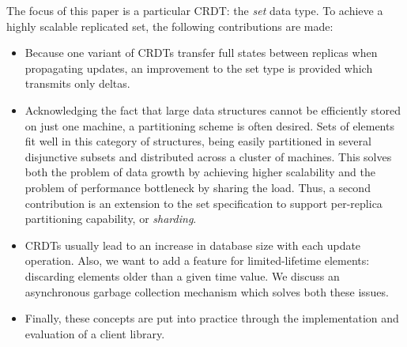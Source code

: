 The focus of this paper is a particular CRDT: the \textit{set} data type. To
achieve a highly scalable replicated set, the following contributions are made:
\begin{itemize}
  \item Because one variant of CRDTs transfer full states between replicas when
  propagating updates, an improvement to the set type is provided which
  transmits only deltas.
  \item Acknowledging the fact that large data structures cannot be efficiently
  stored on just one machine, a partitioning scheme is often desired. Sets of
  elements fit well in this category of structures, being easily partitioned in
  several disjunctive subsets and distributed across a cluster of machines.
  This solves both the problem of data growth by achieving higher scalability
  and the problem of performance bottleneck by sharing the load. Thus, a second
  contribution is an extension to the set specification to support per-replica
  partitioning capability, or \textit{sharding}.
  \item CRDTs usually lead to an increase in database size with each update
  operation. Also, we want to add a feature for limited-lifetime elements:
  discarding elements older than a given time value. We discuss an asynchronous
  garbage collection mechanism which solves both these issues.
  \item Finally, these concepts are put into practice through the implementation
  and evaluation of a client library.
\end{itemize}